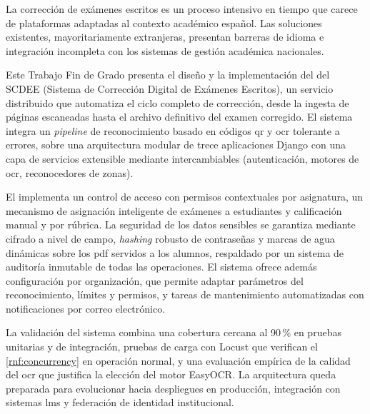 La corrección de exámenes escritos es un proceso intensivo en tiempo que
carece de plataformas adaptadas al contexto académico español. Las
soluciones existentes, mayoritariamente extranjeras, presentan barreras
de idioma e integración incompleta con los sistemas de gestión académica
nacionales.

Este Trabajo Fin de Grado presenta el diseño y la implementación del
 del SCDEE (Sistema de Corrección Digital de Exámenes
Escritos), un servicio distribuido  que automatiza el
ciclo completo de corrección, desde la ingesta de páginas escaneadas
hasta el archivo definitivo del examen corregido. El sistema integra un
\textit{pipeline} de reconocimiento basado en códigos \acs{qr} y
\acs{ocr} tolerante a errores, sobre una arquitectura modular de trece
aplicaciones Django con una capa de servicios extensible mediante
 intercambiables (autenticación, motores de \acs{ocr},
reconocedores de zonas).

El  implementa un control de acceso  con
permisos contextuales por asignatura, un mecanismo de asignación
inteligente de exámenes a estudiantes y calificación manual y por
rúbrica. La seguridad de los datos sensibles se garantiza mediante
cifrado a nivel de campo, \textit{hashing} robusto de contraseñas y
marcas de agua dinámicas sobre los \acs{pdf} servidos a los alumnos,
respaldado por un sistema de auditoría inmutable de todas las
operaciones. El sistema ofrece además configuración por organización,
que permite adaptar parámetros del reconocimiento, límites y permisos, y
tareas de mantenimiento automatizadas con notificaciones por correo
electrónico.

La validación del sistema combina una cobertura cercana al 90\,\% en
pruebas unitarias y de integración, pruebas de carga con Locust que
verifican el \cref{rnf:concurrency} en operación normal, y una
evaluación empírica de la calidad del \acs{ocr} que justifica la
elección del motor EasyOCR. La arquitectura queda preparada para
evolucionar hacia despliegues en producción, integración con sistemas
\acs{lms} y federación de identidad institucional.


